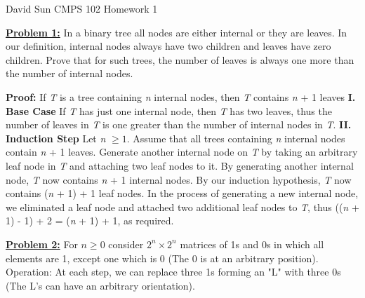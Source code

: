 \documentclass[11pt]{article}
\begin{document}
	\begin{flushleft}
		David Sun\newline
		CMPS 102\newline
		Homework 1\newline

		\item \textbf {\underline{Problem 1:}} 
		In a binary tree all nodes are either internal or they are leaves.  In our definition, internal
		nodes always have two children and leaves have zero children.  Prove that for such trees, the
		number of leaves is always one more than the number of internal nodes.\newline
		
		\textbf{Proof:}\newline
		If \emph{T} is a tree containing \emph{n} internal nodes, then \emph{T} contains \emph{n} + 1 leaves\newline\newline
		\textbf{I. Base Case}\newline
		If \emph{T} has just one internal node, then \emph{T} has two leaves, thus the number of leaves in \emph{T} is one greater than the number of internal nodes in \emph{T}.\newline\newline
		\textbf{II. Induction Step}\newline
		Let \emph{n} $\geq 1$. Assume that all trees containing \emph{n} internal nodes contain \emph{n} + 1 leaves. Generate another internal node on \emph{T} by taking an arbitrary leaf node in \emph{T} and attaching two leaf nodes to it. By generating another internal node, \emph{T} now contains \emph{n} + 1 internal nodes. By our induction hypothesis, \emph{T} now contains (\emph{n} + 1) + 1 leaf nodes. In the process of generating a new internal node, we eliminated a leaf node and attached two additional leaf nodes to \emph{T}, thus \newline ((\emph{n} + 1) - 1) + 2 = (\emph{n} + 1) + 1, as required. 
		\vspace{.2cm}
		
		\item \textbf {\underline{Problem 2:}}
		For $n\ge0$ consider $2^n \times 2^n$ matrices of 1s and 0s in
		which all elements are 1, except one 
		which is 0 (The 0 is at an arbitrary position). 
		Operation: At each step, we can replace three 1s forming an
		"L" with three 0s (The L's can have an arbitrary orientation).\newline
		

\end{flushleft}
\end{document}
